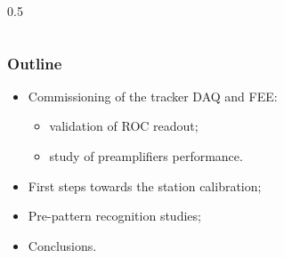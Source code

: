 \documentclass{beamer}
\begin{document}
\begin{frame}
\begin{columns}
\begin{column}{0.5\framewidth}
\begin{figure}[!h]
       \label{fig:momhits2}
\end{figure}
        \end{column}
    \end{columns}
\end{frame}







\begin{frame}
    \frametitle{Outline}
\begin{itemize}
	\item \textcolor{mygray}{Commissioning of the tracker DAQ and FEE:}
	\begin{itemize}
        \vspace{2mm}
    	\item \textcolor{mygray}{validation of ROC readout;}
        \vspace{1.5mm}
    	\item \textcolor{mygray}{study of preamplifiers performance}.
	\end{itemize}
	\vspace{4mm}
    	\item \textcolor{mygray}{First steps towards the station calibration;}
    	\vspace{6mm}
    	\item \textcolor{mygray}{Pre-pattern recognition studies;}
  	\vspace{6mm}
    	\item Conclusions.
\end{itemize}
\end{frame}
\end{document}
